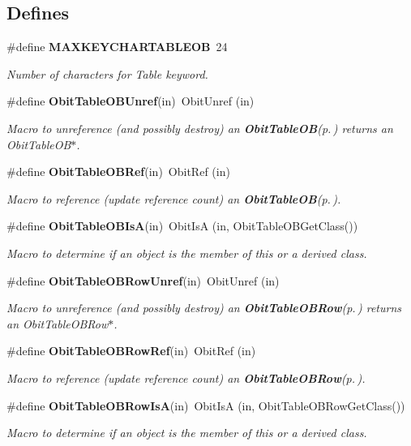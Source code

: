 \subsection*{Defines}
\begin{CompactItemize}
\item 
\#define {\bf MAXKEYCHARTABLEOB}\ 24
\begin{CompactList}\small\item\em Number of characters for Table keyword. \item\end{CompactList}\item 
\#define {\bf Obit\-Table\-OBUnref}(in)\ Obit\-Unref (in)
\begin{CompactList}\small\item\em Macro to unreference (and possibly destroy) an {\bf Obit\-Table\-OB}{\rm (p.\,\pageref{structObitTableOB})} returns an Obit\-Table\-OB$\ast$. \item\end{CompactList}\item 
\#define {\bf Obit\-Table\-OBRef}(in)\ Obit\-Ref (in)
\begin{CompactList}\small\item\em Macro to reference (update reference count) an {\bf Obit\-Table\-OB}{\rm (p.\,\pageref{structObitTableOB})}. \item\end{CompactList}\item 
\#define {\bf Obit\-Table\-OBIs\-A}(in)\ Obit\-Is\-A (in, Obit\-Table\-OBGet\-Class())
\begin{CompactList}\small\item\em Macro to determine if an object is the member of this or a derived class. \item\end{CompactList}\item 
\#define {\bf Obit\-Table\-OBRow\-Unref}(in)\ Obit\-Unref (in)
\begin{CompactList}\small\item\em Macro to unreference (and possibly destroy) an {\bf Obit\-Table\-OBRow}{\rm (p.\,\pageref{structObitTableOBRow})} returns an Obit\-Table\-OBRow$\ast$. \item\end{CompactList}\item 
\#define {\bf Obit\-Table\-OBRow\-Ref}(in)\ Obit\-Ref (in)
\begin{CompactList}\small\item\em Macro to reference (update reference count) an {\bf Obit\-Table\-OBRow}{\rm (p.\,\pageref{structObitTableOBRow})}. \item\end{CompactList}\item 
\#define {\bf Obit\-Table\-OBRow\-Is\-A}(in)\ Obit\-Is\-A (in, Obit\-Table\-OBRow\-Get\-Class())
\begin{CompactList}\small\item\em Macro to determine if an object is the member of this or a derived class. \item\end{CompactList}\end{CompactItemize}
